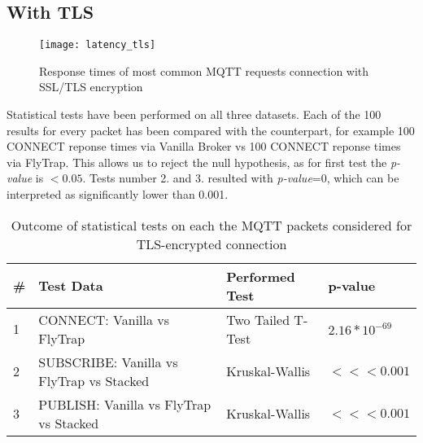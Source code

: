 \subsection{With TLS}
\begin{figure}[H]
    \centering
    \texttt{[image: latency\_tls]}
    \caption{Response times of most common MQTT requests connection with SSL/TLS encryption}
    \label{fig:latency_tls}
\end{figure}

Statistical tests have been performed on all three datasets. Each of the 100 results for every packet has been compared with the counterpart, for example 100 CONNECT reponse times via Vanilla Broker vs 100 CONNECT reponse times via FlyTrap. This allows us to reject the null hypothesis, as for first test the \textit{p-value} is $<0.05$. Tests number 2. and 3. resulted with \textit{p-value}=0, which can be interpreted as significantly lower than 0.001.

\begin{table}[]
\centering
\begin{tabular}{|l|l|l|l|}
\hline
\textbf{\#} & \textbf{Test Data}                       & \textbf{Performed Test} & \textbf{p-value}                      \\ \hline
1           & CONNECT: Vanilla vs FlyTrap              & Two Tailed T-Test       & $2.16*10^{-69}$                    \\ \hline
2           & SUBSCRIBE: Vanilla vs FlyTrap vs Stacked & Kruskal-Wallis          & $<<< 0.001$ \\ \hline
3           & PUBLISH: Vanilla vs FlyTrap vs Stacked & Kruskal-Wallis          & $<<< 0.001$ \\ \hline
\end{tabular}
\caption{Outcome of statistical tests on each the MQTT packets considered for TLS-encrypted connection}
\label{tab:ttest-tls}
\end{table}

